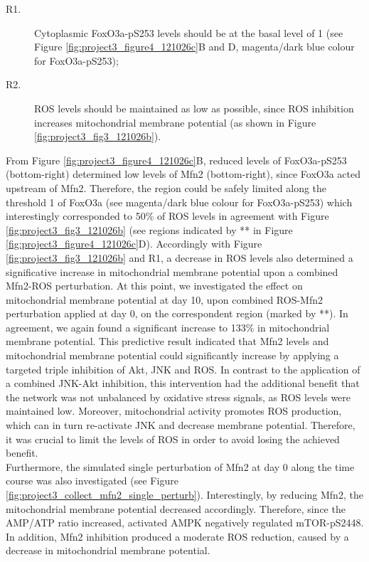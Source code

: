 \begin{description}
 \item[R1.] Cytoplasmic FoxO3a-pS253 levels should be at the basal level of 1 (see Figure \ref{fig:project3_figure4_121026c}B and D, magenta/dark blue colour for FoxO3a-pS253);
 \item[R2.] ROS levels should be maintained as low as possible, since ROS inhibition increases mitochondrial membrane potential (as shown in Figure \ref{fig:project3_fig3_121026b}).
\end{description}
From Figure \ref{fig:project3_figure4_121026c}B, reduced levels of FoxO3a-pS253 (bottom-right) determined low levels of Mfn2 (bottom-right), since FoxO3a acted upstream of Mfn2. Therefore, the region could be safely limited along the threshold 1 of FoxO3a (see magenta/dark blue colour for FoxO3a-pS253) which interestingly corresponded to 50\% of ROS levels in agreement with Figure \ref{fig:project3_fig3_121026b} (see regions indicated by ** in Figure \ref{fig:project3_figure4_121026c}D). Accordingly with Figure \ref{fig:project3_fig3_121026b} and R1, a decrease in ROS levels also determined a significative increase in mitochondrial membrane potential upon a combined Mfn2-ROS perturbation. At this point, we investigated the effect on mitochondrial membrane potential at day 10, upon combined ROS-Mfn2 perturbation applied at day 0, on the correspondent region (marked by **). In agreement, we again found a significant increase to 133\% in mitochondrial membrane potential. This predictive result 
indicated that Mfn2 levels and mitochondrial membrane potential could significantly increase by applying a targeted triple inhibition of Akt, JNK and ROS. In contrast to the application of a combined JNK-Akt inhibition, this intervention had the additional benefit that the network was not unbalanced by oxidative stress signals, as ROS levels were maintained low. Moreover, mitochondrial activity promotes ROS production, which can in turn re-activate JNK and decrease membrane potential. Therefore, it was crucial to limit the levels of ROS in order to avoid losing the achieved benefit.\\
Furthermore, the simulated single perturbation of Mfn2 at day 0 along the time course was also investigated (see Figure \ref{fig:project3_collect_mfn2_single_perturb}). Interestingly, by reducing Mfn2, the mitochondrial membrane potential decreased accordingly. Therefore, since the AMP/ATP ratio increased, activated AMPK negatively regulated mTOR-pS2448. In addition, Mfn2 inhibition produced a moderate ROS reduction, caused by a decrease in mitochondrial membrane potential.


